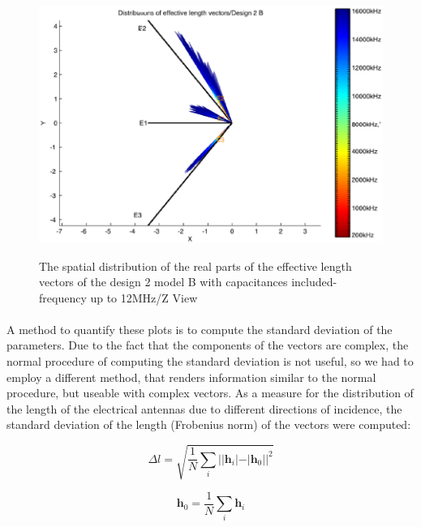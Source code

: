 \documentclass[a4paper,10pt]{thesis}
\begin{document}
\begin{figure}
\begin{center}
\includegraphics[scale=0.65]{HeffVerteilungD2-ZView_B_caps3.eps} \\
\caption{The spatial distribution of the real parts of the effective length vectors of the design 2 model B with capacitances included-frequency up to 12MHz/Z View }\label{fig_heff_dist_D2_B_Z_View_caps3}
\end{center}
\end{figure}

\paragraph*{}
A method to quantify these plots is to compute the standard
deviation of the parameters. Due to the fact that the components
of the vectors are complex, the normal procedure of computing the
standard deviation is not useful, so we had to employ a different
method, that renders information similar to the normal procedure,
but useable with complex vectors. As a measure for the
distribution of the length of the electrical antennas due to
different directions of incidence, the standard deviation of the
length (Frobenius norm) of the vectors were computed:

\begin{equation}
\Delta l = \sqrt{\frac{1}{N} \sum_i \vert \vert{\textbf{h}}_i\vert
- \vert{\textbf{h}}_0 \vert \vert^2}
\end{equation}

\begin{equation}
\textbf{h}_0=\frac{1}{N}\sum_i \textbf{h}_i
\end{equation}
\end{document}
